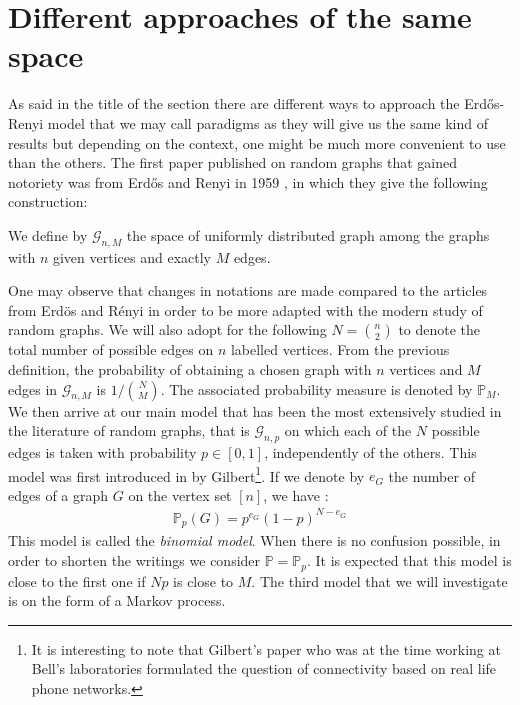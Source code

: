 \section{Different approaches of the same space}
As said in the title of the section there are different ways to approach the Erd\H{o}s-Renyi model that we may call paradigms as they will give us the same kind of results but depending on the context, one might be much more convenient to use than the others.
\newline
The first paper published on random graphs that gained notoriety was from Erd\H{o}s and Renyi in 1959 \cite{erdos59}, in which they give the following construction:
\begin{definition}
We define by $\mathcal{G}_{n, M}$ the space of uniformly distributed graph among the graphs with $n$ given vertices and exactly $M$ edges.
\end{definition}
One may observe that changes in notations are made compared to the articles from Erd\"os and R\'enyi in order to be more adapted with the modern study of random graphs.
We will also adopt for the following $N = \binom{n}{2}$ to denote the total number of possible edges on $n$ labelled vertices.
From the previous definition, the probability of obtaining a chosen graph with $n$ vertices and $M$ edges in $\mathcal{G}_{n, M}$ is $1/\binom{N}{M}$.
The associated probability measure is denoted by $\mathbb{P}_M$.
\newline
We then arrive at our main model that has been the most extensively studied in the literature of random graphs, that is $\mathcal{G}_{n, p}$ on which each of the $N$ possible edges is taken with probability $p \in [0, 1]$, independently of the others.
This model was first introduced in \cite{Gilbert59} by Gilbert\footnote{It is interesting to note that Gilbert's paper who was at the time working at Bell's laboratories formulated the question of connectivity based on real life phone networks.}.
\newline
If we denote by $e_G$ the number of edges of a graph $G$ on the vertex set $[n]$, we have :
\begin{align}
	\mathbb{P}_p(G) = p^{e_G}(1-p)^{N-e_G}
\end{align}
This model is called the \emph{binomial model}.
When there is no confusion possible, in order to shorten the writings we consider $\mathbb{P}=\mathbb{P}_p$.
It is expected that this model is close to the first one if $Np$ is close to $M$.
\newline
The third model that we will investigate is on the form of a Markov process. 
